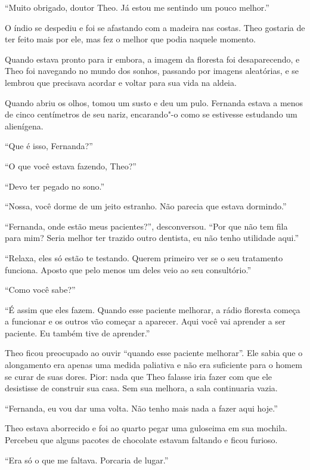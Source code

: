 ``Muito obrigado, doutor Theo. Já estou me sentindo um pouco melhor.''

O índio se despediu e foi se afastando com a madeira nas costas. Theo
gostaria de ter feito mais por ele, mas fez o melhor que podia naquele
momento.

Quando estava pronto para ir embora, a imagem da floresta foi
desaparecendo, e Theo foi navegando no mundo dos sonhos, passando por
imagens aleatórias, e se lembrou que precisava acordar e voltar para sua
vida na aldeia.

Quando abriu os olhos, tomou um susto e deu um pulo. Fernanda estava a
menos de cinco centímetros de seu nariz, encarando"-o como se estivesse
estudando um alienígena.

``Que é isso, Fernanda?''

``O que você estava fazendo, Theo?''

``Devo ter pegado no sono.''

``Nossa, você dorme de um jeito estranho. Não parecia que estava
dormindo.''

``Fernanda, onde estão meus pacientes?'', desconversou. ``Por que não
tem fila para mim? Seria melhor ter trazido outro dentista, eu não tenho
utilidade aqui.''

``Relaxa, eles só estão te testando. Querem primeiro ver se o seu
tratamento funciona. Aposto que pelo menos um deles veio ao seu
consultório.''

``Como você sabe?''

``É assim que eles fazem. Quando esse paciente melhorar, a rádio
floresta começa a funcionar e os outros vão começar a aparecer. Aqui
você vai aprender a ser paciente. Eu também tive de aprender.''

Theo ficou preocupado ao ouvir ``quando esse paciente melhorar''. Ele
sabia que o alongamento era apenas uma medida paliativa e não era
suficiente para o homem se curar de suas dores. Pior: nada que Theo
falasse iria fazer com que ele desistisse de construir sua casa. Sem sua
melhora, a sala continuaria vazia.

``Fernanda, eu vou dar uma volta. Não tenho mais nada a fazer aqui
hoje.''

\asterisc


Theo estava aborrecido e foi ao quarto pegar uma guloseima em sua
mochila. Percebeu que alguns pacotes de chocolate estavam faltando e
ficou furioso.

``Era só o que me faltava. Porcaria de lugar.''

